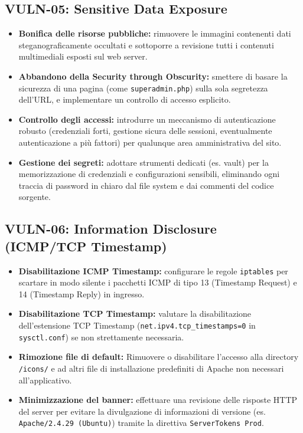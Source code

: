 \documentclass[11pt]{report}
\begin{document}
	\subsection{VULN-05: Sensitive Data Exposure}
	\begin{itemize}[leftmargin=*]
		\item \textbf{Bonifica delle risorse pubbliche:} rimuovere le immagini contenenti dati steganograficamente occultati e sottoporre a revisione tutti i contenuti multimediali esposti sul web server.
		\item \textbf{Abbandono della Security through Obscurity:} smettere di basare la sicurezza di una pagina (come \texttt{superadmin.php}) sulla sola segretezza dell'URL, e implementare un controllo di accesso esplicito.
		\item \textbf{Controllo degli accessi:} introdurre un meccanismo di autenticazione robusto (credenziali forti, gestione sicura delle sessioni, eventualmente autenticazione a più fattori) per qualunque area amministrativa del sito.
		\item \textbf{Gestione dei segreti:} adottare strumenti dedicati (es. vault) per la memorizzazione di credenziali e configurazioni sensibili, eliminando ogni traccia di password in chiaro dal file system e dai commenti del codice sorgente.
	\end{itemize}
	
	\subsection{VULN-06: Information Disclosure (ICMP/TCP Timestamp)}
	\begin{itemize}[leftmargin=*]
		\item \textbf{Disabilitazione ICMP Timestamp:} configurare le regole \texttt{iptables} per scartare in modo silente i pacchetti ICMP di tipo 13 (Timestamp Request) e 14 (Timestamp Reply) in ingresso.
		\item \textbf{Disabilitazione TCP Timestamp:} valutare la disabilitazione dell'estensione TCP Timestamp (\texttt{net.ipv4.tcp\_timestamps=0} in \texttt{sysctl.conf}) se non strettamente necessaria.
		\item \textbf{Rimozione file di default:} Rimuovere o disabilitare l'accesso alla directory \texttt{/icons/} e ad altri file di installazione predefiniti di Apache non necessari all'applicativo.
		\item \textbf{Minimizzazione del banner:} effettuare una revisione delle risposte HTTP del server per evitare la divulgazione di informazioni di versione (es. \texttt{Apache/2.4.29 (Ubuntu)}) tramite la direttiva \texttt{ServerTokens Prod}.
	\end{itemize}
	
\end{document}
